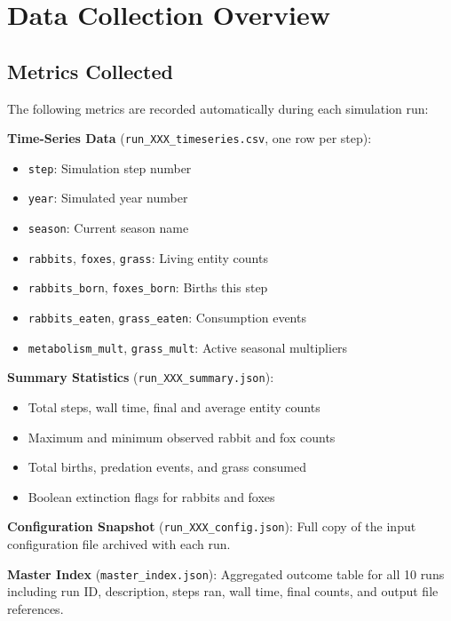\documentclass[12pt]{article}
\begin{document}
\section{Data Collection Overview}

\subsection{Metrics Collected}

The following metrics are recorded automatically during each simulation run:

\textbf{Time-Series Data} (\texttt{run\_XXX\_timeseries.csv}, one row per step):
\begin{itemize}
    \item \texttt{step}: Simulation step number
    \item \texttt{year}: Simulated year number
    \item \texttt{season}: Current season name
    \item \texttt{rabbits}, \texttt{foxes}, \texttt{grass}: Living entity counts
    \item \texttt{rabbits\_born}, \texttt{foxes\_born}: Births this step
    \item \texttt{rabbits\_eaten}, \texttt{grass\_eaten}: Consumption events
    \item \texttt{metabolism\_mult}, \texttt{grass\_mult}: Active seasonal multipliers
\end{itemize}

\textbf{Summary Statistics} (\texttt{run\_XXX\_summary.json}):
\begin{itemize}
    \item Total steps, wall time, final and average entity counts
    \item Maximum and minimum observed rabbit and fox counts
    \item Total births, predation events, and grass consumed
    \item Boolean extinction flags for rabbits and foxes
\end{itemize}

\textbf{Configuration Snapshot} (\texttt{run\_XXX\_config.json}): Full copy of
the input configuration file archived with each run.

\textbf{Master Index} (\texttt{master\_index.json}): Aggregated outcome table
for all 10 runs including run ID, description, steps ran, wall time, final
counts, and output file references.
\end{document}
